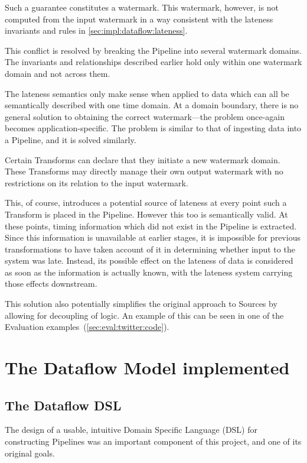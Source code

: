 Such a guarantee constitutes a watermark.
This watermark, however, is not computed from the input watermark in a way consistent with the lateness invariants and rules in \cref{sec:impl:dataflow:lateness}.

This conflict is resolved by breaking the Pipeline into several watermark domains.
The invariants and relationships described earlier hold only within one watermark domain and not across them.

The lateness semantics only make sense when applied to data which can all be semantically described with one time domain.
At a domain boundary, there is no general solution to obtaining the correct watermark---the problem once-again becomes application-specific.
The problem is similar to that of ingesting data into a Pipeline, and it is solved similarly.

Certain Transforms can declare that they initiate a new watermark domain.
These Transforms may directly manage their own output watermark with no restrictions on its relation to the input watermark.

This, of course, introduces a potential source of lateness at every point such a Transform is placed in the Pipeline.
However this too is semantically valid.
At these points, timing information which did not exist in the Pipeline is extracted.
Since this information is unavailable at earlier stages, it is impossible for previous transformations to have taken account of it in determining whether input to the system was late.
Instead, its possible effect on the lateness of data is considered as soon as the information is actually known, with the lateness system carrying those effects downstream.

This solution also potentially simplifies the original approach to Sources by allowing for decoupling of logic.
An example of this can be seen in one of the Evaluation examples~(\cref{sec:eval:twitter:code}).

\section{The Dataflow Model implemented}\label{sec:impl:approach}

\subsection{The Dataflow DSL}\label{sec:impl:approach:dsl}

The design of a usable, intuitive Domain Specific Language (DSL) for constructing Pipelines was an important component of this project, and one of its original goals.

